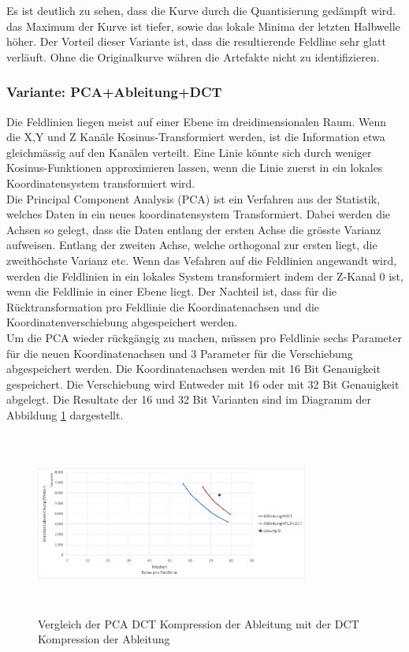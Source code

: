 Es ist deutlich zu sehen, dass die Kurve durch die Quantisierung gedämpft wird. das Maximum der Kurve ist tiefer, sowie das lokale Minima der letzten Halbwelle höher. Der Vorteil dieser Variante ist, dass die resultierende Feldline sehr glatt verläuft. Ohne die Originalkurve währen die Artefakte nicht zu identifizieren.

\subsubsection{Variante: PCA+Ableitung+DCT}
Die Feldlinien liegen meist auf einer Ebene im dreidimensionalen Raum. Wenn die X,Y und Z Kanäle Kosinus-Transformiert werden, ist die Information etwa gleichmässig auf den Kanälen verteilt. Eine Linie könnte sich durch weniger Kosinus-Funktionen approximieren lassen, wenn die Linie zuerst in ein lokales Koordinatensystem transformiert wird.\\
Die Principal Component Analysis (PCA)\cite{abdi2010principal} ist ein Verfahren aus der Statistik, welches Daten in ein neues koordinatensystem Transformiert. Dabei werden die Achsen so gelegt, dass die Daten entlang der ersten Achse die grösste Varianz aufweisen. Entlang der zweiten Achse, welche orthogonal zur ersten liegt, die zweithöchste Varianz etc. Wenn das Vefahren auf die Feldlinien angewandt wird, werden die Feldlinien in ein lokales System transformiert indem der Z-Kanal 0 ist, wenn die Feldlinie in einer Ebene liegt. Der Nachteil ist, dass für die Rücktransformation pro Feldlinie die Koordinatenachsen und die Koordinatenverschiebung abgespeichert werden.\\
Um die PCA wieder rückgängig zu machen, müssen pro Feldlinie sechs Parameter für die neuen Koordinatenachsen und 3 Parameter für die Verschiebung abgespeichert werden. Die Koordinatenachsen werden mit 16 Bit Genauigkeit gespeichert. Die Verschiebung wird Entweder mit 16 oder mit 32 Bit Genauigkeit abgelegt. Die Resultate der 16 und 32 Bit Varianten sind im Diagramm der Abbildung \ref{resultate:loesung1:dct:pca} dargestellt.
\begin{figure}[!htbp]
	\center
	\includegraphics[width=0.8\textwidth,height=6cm,keepaspectratio]{./pictures/resultate/loesung1/loesung1-4/loesung1_4.png}
	\caption{Vergleich der PCA DCT Kompression der Ableitung mit der DCT Kompression der Ableitung}
	\label{resultate:loesung1:dct:pca}
\end{figure}
